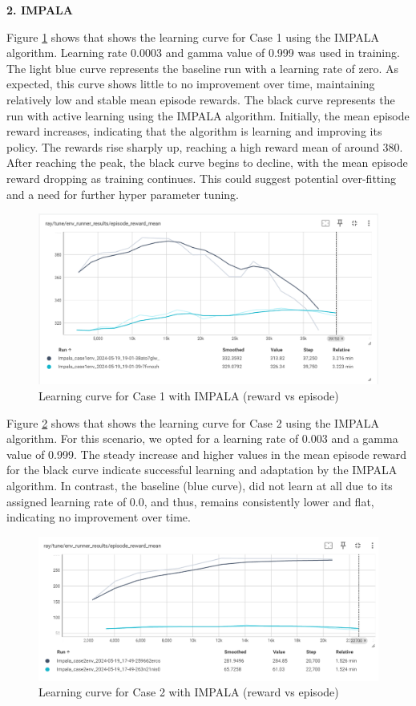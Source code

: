 \documentclass[conference]{IEEEtran}
\begin{document}
\textbf{2. IMPALA}

Figure \ref{fig:impala_case1} shows that shows the learning curve for Case 1 using the IMPALA algorithm. Learning rate 0.0003 and gamma value of 0.999 was used in training. The light blue curve represents the baseline run with a learning rate of zero. As expected, this curve shows little to no improvement over time, maintaining relatively low and stable mean episode rewards. The black curve represents the run with active learning using the IMPALA algorithm. Initially, the mean episode reward increases, indicating that the algorithm is learning and improving its policy. The rewards rise sharply up, reaching a high reward mean of around 380. After reaching the peak, the black curve begins to decline, with the mean episode reward dropping as training continues. This could suggest potential over-fitting and a need for further hyper parameter tuning.
\begin{figure}[htp]
    \centering
    \includegraphics[width=\columnwidth]{images/LC_case1_IMPALA.png}
    \caption{Learning curve for Case 1 with IMPALA (reward vs episode)}
    \label{fig:impala_case1}
\end{figure}

Figure \ref{fig:impala_case2} shows that shows the learning curve for Case 2 using the IMPALA algorithm. For this scenario, we opted for a learning rate of 0.003 and a gamma value of 0.999. The steady increase and higher values in the mean episode reward for the black curve indicate successful learning and adaptation by the IMPALA algorithm. In contrast, the baseline (blue curve), did not learn at all due to its assigned learning rate of 0.0, and thus, remains consistently lower and flat, indicating no improvement over time.

\begin{figure}[htp]
    \centering
    \includegraphics[width=\columnwidth]{images/LC_case2_IMPALA.png}
    \caption{Learning curve for Case 2 with IMPALA (reward vs episode)}
    \label{fig:impala_case2}
\end{figure}
\end{document}
